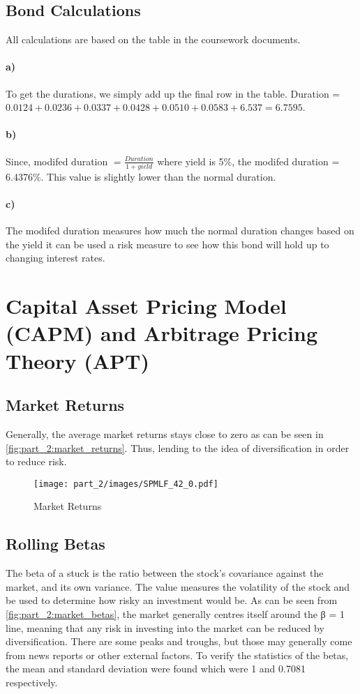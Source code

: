 \subsection{Bond Calculations}
All calculations are based on the table in the coursework documents.

\paragraph{a)} To get the durations, we simply add up the final row in the table.
Duration = $0.0124+0.0236+0.0337+0.0428+0.0510+0.0583+6.537=6.7595$. 

\paragraph{b)} Since, modifed duration $= \frac{Duration}{1+yield}$ where yield is 5\%, the modifed duration = 6.4376\%. This value is slightly lower than the normal duration.

\paragraph{c)} The modifed duration measures how much the normal duration changes based on the yield it can be used a risk measure to see how this bond will hold up to changing interest rates.


\section{Capital Asset Pricing Model (CAPM) and Arbitrage Pricing Theory (APT)}

\subsection{Market Returns}
Generally, the average market returns stays close to zero as can be seen in \autoref{fig:part_2:market_returns}. Thus, lending to the idea of diversification in order to reduce risk.

\begin{figure}[!htb]
    \centering
    \texttt{[image: part\_2/images/SPMLF\_42\_0.pdf]}
    \caption{Market Returns}
    \label{fig:part_2:market_returns}
\end{figure}

\subsection{Rolling Betas}
\label{part_2:betas}
The beta of a stuck is the ratio between the stock's covariance against the market, and its own variance. The value measures the volatility of the stock and be used to determine how risky an investment would be. As can be seen from \autoref{fig:part_2:market_betas}, the market generally centres itself around the β = 1 line, meaning that any risk in investing into the market can be reduced by diversification. There are some peaks and troughs, but those may generally come from news reports or other external factors. To verify the statistics of the betas, the mean and standard deviation were found which were 1 and 0.7081 respectively.

